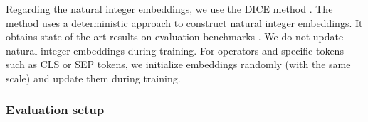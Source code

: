 Regarding the natural integer embeddings, we use the DICE method \parencite{sundararaman_20}. The method uses a deterministic approach to construct natural integer embeddings. It obtains state-of-the-art results on evaluation benchmarks \parencite{wallace_19}. We do not update natural integer embeddings during training. For operators and specific tokens such as CLS or SEP tokens, we initialize embeddings randomly (with the same scale) and update them during training. 

\subsubsection{Evaluation setup}

